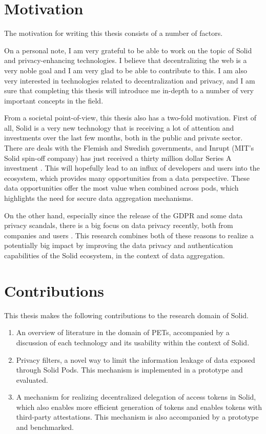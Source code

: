 \section{Motivation}
\label{sec:motivation}
The motivation for writing this thesis consists of a number of factors. 

On a personal note, I am very grateful to be able to work on the topic of Solid and privacy-enhancing technologies. I believe that decentralizing the web is a very noble goal and I am very glad to be able to contribute to this. I am also very interested in technologies related to decentralization and privacy, and I am sure that completing this thesis will introduce me in-depth to a number of very important concepts in the field.

From a societal point-of-view, this thesis also has a two-fold motivation. First of all, Solid is a very new technology that is receiving a lot of attention and investments over the last few months, both in the public and private sector. There are deals with the Flemish  and Swedish  governments, and Inrupt (MIT's Solid spin-off company) has just received a thirty million dollar Series A investment . This will hopefully lead to an influx of developers and users into the ecosystem, which provides many opportunities from a data perspective. These data opportunities offer the most value when combined across pods, which highlights the need for secure data aggregation mechanisms.

On the other hand, especially since the release of the GDPR and some data privacy scandals, there is a big focus on data privacy recently, both from companies and users . This research combines both of these reasons to realize a potentially big impact by improving the data privacy and authentication capabilities of the Solid  ecosystem, in the context of data aggregation. 

\section{Contributions}
\label{sec:contributions}
This thesis makes the following contributions to the research domain of Solid.
\begin{enumerate}
    \item An overview of literature in the domain of \acrlong{PETs}, accompanied by a discussion of each technology and its usability within the context of Solid.
    \item Privacy filters, a novel way to limit the information leakage of data exposed through Solid Pods. This mechanism is implemented in a prototype and evaluated.
    \item A mechanism for realizing decentralized delegation of access tokens in Solid, which also enables more efficient generation of tokens and enables tokens with third-party attestations. This mechanism is also accompanied by a prototype and benchmarked.
\end{enumerate}

